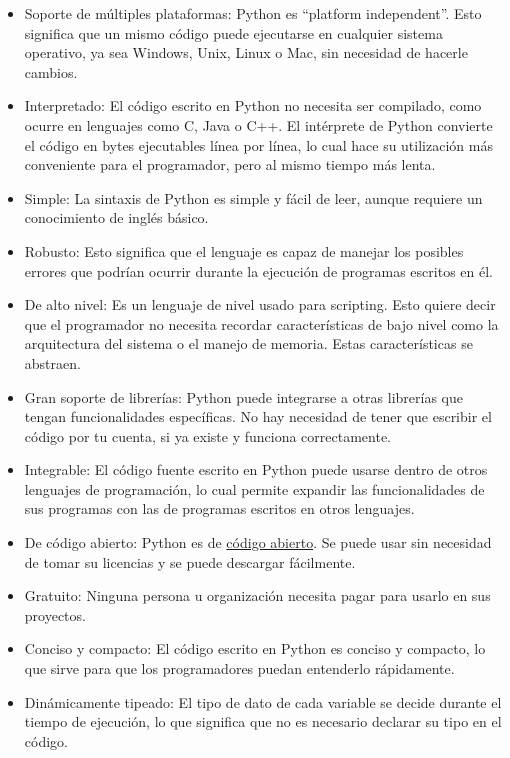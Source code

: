 \documentclass{report}
\newcommand{\doble}[1]{``#1''}
\begin{document}
\begin{itemize}
  \item Soporte de múltiples plataformas: Python es \doble{platform independent}. Esto significa que un mismo código puede ejecutarse en cualquier sistema operativo, ya sea Windows, Unix, Linux o Mac, sin necesidad de hacerle cambios.
  
  \item Interpretado: El código escrito en Python no necesita ser compilado, como ocurre en lenguajes como C, Java o C++. El intérprete de Python convierte el código en bytes ejecutables línea por línea, lo cual hace su utilización más conveniente para el programador, pero al mismo tiempo más lenta.
  
  \item Simple: La sintaxis de Python es simple y fácil de leer, aunque requiere un conocimiento de inglés básico.
  
  \item Robusto: Esto significa que el lenguaje es capaz de manejar los posibles errores que podrían ocurrir durante la ejecución de programas escritos en él.
  
  \item De alto nivel: Es un lenguaje de nivel usado para scripting. Esto quiere decir que el programador no necesita recordar características de bajo nivel como la arquitectura del sistema o el manejo de memoria. Estas características se abstraen.
  
  \item Gran soporte de librerías: Python puede integrarse a otras librerías que tengan funcionalidades específicas. No hay necesidad de tener que escribir el código por tu cuenta, si ya existe y funciona correctamente.
  
  \item Integrable: El código fuente escrito en Python puede usarse dentro de otros lenguajes de programación, lo cual permite expandir las funcionalidades de sus programas con las de programas escritos en otros lenguajes.
  
  \item De código abierto: Python es de \href{https://opensource.org/about}{código abierto}. Se puede usar sin necesidad de tomar su licencias y se puede descargar fácilmente.
  
  \item Gratuito: Ninguna persona u organización necesita pagar para usarlo en sus proyectos.
  
  \item Conciso y compacto: El código escrito en Python es conciso y compacto, lo que sirve para que los programadores puedan entenderlo rápidamente.
  
  \item Dinámicamente tipeado: El tipo de dato de cada variable se decide durante el tiempo de ejecución, lo que significa que no es necesario declarar su tipo en el código.
  
\end{itemize}
\end{document}
